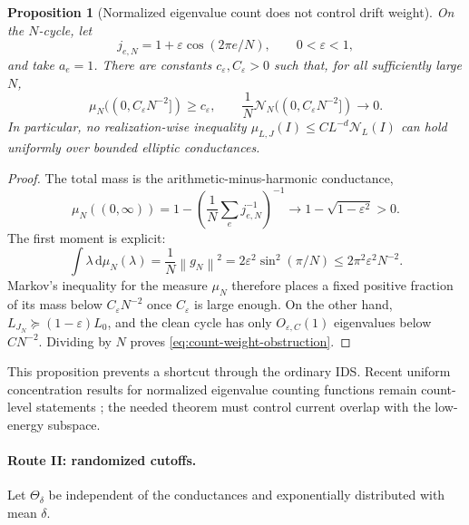 \documentclass[11pt]{article}
\newtheorem{proposition}[theorem]{Proposition}
\theoremstyle{definition}
\theoremstyle{remark}
\newcommand{\norm}[1]{\left\lVert #1\right\rVert}
\newcommand{\dd}{\,\mathrm d}
\newcommand{\eps}{\varepsilon}
\begin{document}
\begin{proposition}[Normalized eigenvalue count does not control drift weight]
\label{prop:count-does-not-control-drift}
On the $N$-cycle, let
\begin{equation}
 j_{e,N}=1+\eps\cos(2\pi e/N),\qquad 0<\eps<1,
 \label{eq:modulated-cycle-second-use}
\end{equation}
and take $a_e=1$.  There are constants
$c_\eps,C_\eps>0$ such that, for all sufficiently large $N$,
\begin{equation}
 \boxed{
 \mu_N((0,C_\eps N^{-2}])\ge c_\eps,
 \qquad
 \frac1N\mathcal N_N((0,C_\eps N^{-2}])\longrightarrow0.}
 \label{eq:count-weight-obstruction}
\end{equation}
In particular, no realization-wise inequality
$\mu_{L,J}(I)\le C L^{-d}\mathcal N_L(I)$ can hold uniformly over bounded
elliptic conductances.
\end{proposition}

\begin{proof}
The total mass is the arithmetic-minus-harmonic conductance,
\[
 \mu_N((0,\infty))
 =1-\left(\frac1N\sum_ej_{e,N}^{-1}\right)^{-1}
 \longrightarrow1-\sqrt{1-\eps^2}>0.
\]
The first moment is explicit:
\[
 \int\lambda\dd\mu_N(\lambda)
 =\frac1N\norm{g_N}^2
 =2\eps^2\sin^2(\pi/N)
 \le2\pi^2\eps^2N^{-2}.
\]
Markov's inequality for the measure $\mu_N$ therefore places a fixed positive
fraction of its mass below $C_\eps N^{-2}$ once $C_\eps$ is large enough.
On the other hand,
$L_{J_N}\succeq(1-\eps)L_0$, and the clean cycle has only
$O_{\eps,C}(1)$ eigenvalues below $CN^{-2}$.  Dividing by $N$ proves
\eqref{eq:count-weight-obstruction}.
\end{proof}

This proposition prevents a shortcut through the ordinary IDS.  Recent
uniform concentration results for normalized eigenvalue counting functions
remain count-level statements \cite{KamperEtAl2026}; the needed theorem must
control current overlap with the low-energy subspace.

\paragraph{Route II: randomized cutoffs.}
Let $\Theta_\delta$ be independent of the conductances and exponentially
distributed with mean $\delta$.
\end{document}
